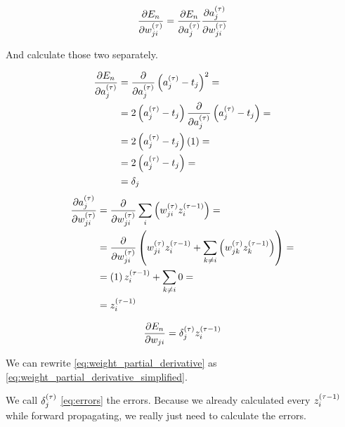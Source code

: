 \documentclass[a4paper,12pt]{article}
\theoremstyle{mytheoremstyle}
\theoremstyle{mytheoremstyle}
\theoremstyle{myproblemstyle}
\begin{document}
    \begin{equation}
        \frac{\partial {E_{n}}}{\partial {w_{ji}^{\left( \tau \right)}}} = \frac{\partial {E_{n}}}{\partial {a_{j}^{\left( \tau \right)}}} \frac{\partial {a_{j}^{\left( \tau \right)}}}{\partial {w_{ji}^{\left( \tau \right)}}}
        \label{eq:weight_partial_derivative}
    \end{equation}

    And calculate those two separately.

    \begin{equation}
        \begin{split}
            \frac{\partial {E_{n}}}{\partial {a_{j}^{\left( \tau \right)}}} & = \frac{\partial {}}{\partial {a_{j}^{\left( \tau \right)}}} \left( a_{j}^{\left( \tau \right)} - t_{j} \right)^{2} = \\
            & = 2 \left( a_{j}^{\left( \tau \right)} - t_{j} \right) \frac{\partial {}}{\partial {a_{j}^{\left( \tau \right)}}} \left( a_{j}^{\left( \tau \right)} - t_{j} \right) = \\
            & = 2 \left( a_{j}^{\left( \tau \right)} - t_{j} \right) \left( 1 \right) = \\
            & = 2 \left( a_{j}^{\left( \tau \right)} - t_{j} \right) = \\
            & = \delta_{j}
        \end{split}
        \label{eq:errors}
    \end{equation}
    \begin{equation}
        \begin{split}
            \frac{\partial {a_{j}^{\left( \tau \right)}}}{\partial {w_{ji}^{\left( \tau \right)}}} & = \frac{\partial {}}{\partial {w_{ji}^{\left( \tau \right)}}} \displaystyle\sum_{i} \left( w_{ji}^{\left( \tau \right)} z_{i}^{\left( \tau - {1} \right)} \right) = \\
            & = \frac{\partial {}}{\partial {w_{ji}^{\left( \tau \right)}}} \left( w_{ji}^{\left( \tau \right)} z_{i}^{\left( \tau - {1} \right)} + \displaystyle\sum_{k \neq i} \left( w_{jk}^{\left( \tau \right)} z_{k}^{\left( \tau - {1} \right)} \right) \right) = \\
            & = \left( 1 \right) z_{i}^{\left( \tau - {1} \right)} + \displaystyle\sum_{k \neq i} 0 = \\
            & = z_{i}^{\left( \tau - {1} \right)}
        \end{split}
    \end{equation}

    \begin{equation}
        \frac{\partial {E_{n}}}{\partial {w_{ji}}} = \delta_{j}^{\left( \tau \right)} z_{i}^{\left( \tau - {1} \right)}
        \label{eq:weight_partial_derivative_simplified}
    \end{equation}

    We can rewrite \eqref{eq:weight_partial_derivative} as
    \eqref{eq:weight_partial_derivative_simplified}.

    We call $ \delta_{j}^{\left( \tau \right)} $ \eqref{eq:errors} the errors. Because we
    already calculated every $ z_{i}^{\left( \tau - {1} \right)} $ while forward propagating,
    we really just need to calculate the errors.
\end{document}

